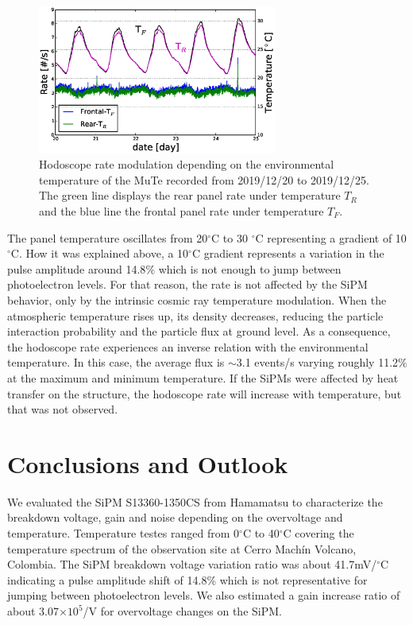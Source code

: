 \documentclass[a4paper,11pt]{article}
\begin{document}
\begin{figure}[htbp]
\centering 
\includegraphics[width=0.7\textwidth]{Figures/Modulation.eps}
\caption{\label{fig:temp} Hodoscope rate modulation depending on the environmental temperature of the MuTe recorded from 2019/12/20 to 2019/12/25. The green line displays the rear panel rate under temperature $T_R$ and the blue line the frontal panel rate under temperature $T_F$. }
\end{figure}

The panel temperature oscillates from 20$^{\circ}$C to 30 $^{\circ}$C representing a gradient of 10$^{\circ}$C. How it was explained above, a 10$^{\circ}$C gradient represents a variation in the pulse amplitude around 14.8$\%$ which is not enough to jump between photoelectron levels. For that reason, the rate is not affected by the SiPM behavior, only by the intrinsic cosmic ray temperature modulation. When the atmospheric temperature rises up, its density decreases, reducing the particle interaction probability and the particle flux at ground level. As a consequence, the hodoscope rate experiences an inverse relation with the environmental temperature. In this case, the average flux is $\sim$3.1 events/s varying roughly 11.2$\%$ at the maximum and minimum temperature. If the SiPMs were affected by heat transfer on the structure, the hodoscope rate will increase with temperature, but that was not observed.

\section{Conclusions and Outlook}
\label{sec:conc}

We evaluated the SiPM S13360-1350CS from Hamamatsu to characterize the breakdown voltage, gain and noise depending on the overvoltage and temperature. Temperature testes ranged from 0$^{\circ}$C to 40$^{\circ}$C covering the temperature spectrum of the observation site at Cerro Mach\'in Volcano, Colombia. The SiPM breakdown voltage variation ratio was about 41.7mV/$^{\circ}$C indicating a pulse amplitude shift of 14.8$\%$ which is not representative for jumping between photoelectron levels. We also estimated a gain increase ratio of about 3.07$\times 10^5$/V for overvoltage changes on the SiPM. 
\end{document}
